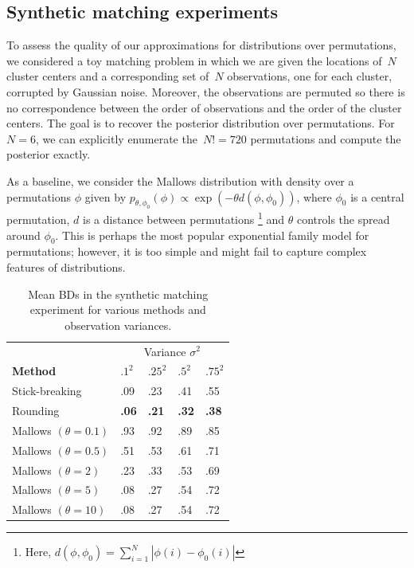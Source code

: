 \documentclass[twoside]{article}
\begin{document}

 \subsection{Synthetic matching experiments}
 To assess the quality of our approximations for distributions over
 permutations, we considered a toy matching problem in which we are given the locations of~$N$ cluster centers and a corresponding set of~$N$
 observations, one for each cluster, corrupted by Gaussian noise.
 Moreover, the observations are permuted so there is no correspondence
 between the order of observations and the order of the cluster centers.
 The goal is to recover the posterior distribution over permutations.
 For~$N=6$, we can explicitly enumerate the~$N!=720$ permutations and
 compute the posterior exactly. 
 
 As a baseline, we consider the Mallows distribution  \cite{Mallows1957} with density over a permutations $\phi$ given by $p_{\theta, \phi_0}(\phi)\propto \exp(-\theta d(\phi,\phi_0))$, where $\phi_0$ is a central permutation, $d$ is a distance between permutations \footnote{Here, $d(\phi,\phi_0)=\sum_{i=1}^N |\phi(i)-\phi_0(i)|$} and $\theta$ controls the spread around $\phi_0$. This is perhaps the most popular exponential family model for permutations; however, it is too simple and might fail to capture complex features of distributions.

 \begin{table}[h]
  \caption{Mean BDs in the synthetic matching experiment for various methods and observation variances.}
  \label{table:BDs}
  \centering
  \begin{tabular}{lllll}
    & \multicolumn{4}{c}{Variance $\sigma^2$} \\
    \cmidrule(lr){3-4} 
    \textbf{Method} & $.1^2$ & $.25^2$ & $.5^2$ & $.75^2$ \\
    \hline
    Stick-breaking & .09 & .23 & .41 & .55 \\
    Rounding & \textbf{.06} & \textbf{.21}  & \textbf{.32}  & \textbf{.38} \\
    Mallows $(\theta=0.1)$ & .93 & .92 & .89  & .85 \\
    Mallows $(\theta=0.5)$ & .51 & .53  & .61 & .71 \\
    Mallows $(\theta=2)$ & .23 & .33 & .53  & .69 \\
    Mallows $(\theta=5)$ & .08 & .27 & .54 & .72 \\
    Mallows $(\theta=10)$ & .08 & .27 & .54  & .72 \\
    \bottomrule
  \end{tabular}
\end{table}
\end{document}
